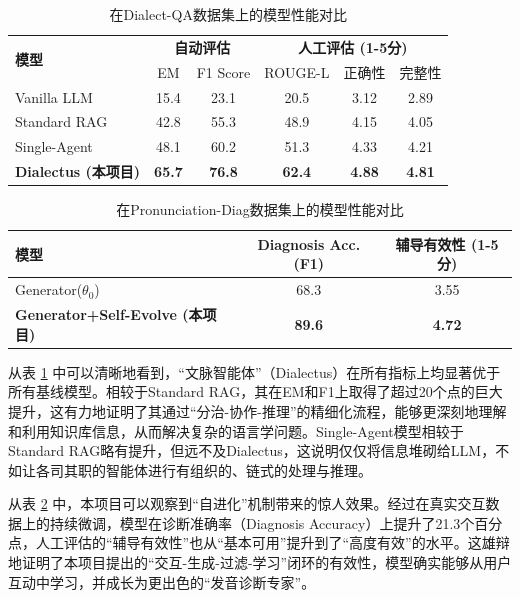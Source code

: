 \begin{table}[H]
    \centering
    \caption{在Dialect-QA数据集上的模型性能对比}
    \label{tab:main_results_qa}
    \begin{tabular}{@{}l|cc|c|cc@{}}
        \toprule
        \multirow{2}{*}{\textbf{模型}} & \multicolumn{2}{c|}{\textbf{自动评估}} & \multicolumn{3}{c}{\textbf{人工评估 (1-5分)}} \\
        & EM & F1 Score & ROUGE-L & 正确性 & 完整性 \\
        \midrule
        Vanilla LLM & 15.4 & 23.1 & 20.5 & 3.12 & 2.89 \\
        Standard RAG & 42.8 & 55.3 & 48.9 & 4.15 & 4.05 \\
        Single-Agent & 48.1 & 60.2 & 51.3 & 4.33 & 4.21 \\
        \textbf{Dialectus (本项目)} & \textbf{65.7} & \textbf{76.8} & \textbf{62.4} & \textbf{4.88} & \textbf{4.81} \\
        \bottomrule
    \end{tabular}
\end{table}

\begin{table}[H]
    \centering
    \caption{在Pronunciation-Diag数据集上的模型性能对比}
    \label{tab:main_results_diag}
    \begin{tabular}{@{}l|c|c@{}}
        \toprule
        \textbf{模型} & \textbf{Diagnosis Acc. (F1)} & \textbf{辅导有效性 (1-5分)} \\
        \midrule
        Generator($\theta_0$) & 68.3 & 3.55 \\
        \textbf{Generator+Self-Evolve (本项目)} & \textbf{89.6} & \textbf{4.72} \\
        \bottomrule
    \end{tabular}
\end{table}

从表 \ref{tab:main_results_qa} 中可以清晰地看到，“文脉智能体”（Dialectus）在所有指标上均显著优于所有基线模型。相较于Standard RAG，其在EM和F1上取得了超过20个点的巨大提升，这有力地证明了其通过“分治-协作-推理”的精细化流程，能够更深刻地理解和利用知识库信息，从而解决复杂的语言学问题。Single-Agent模型相较于Standard RAG略有提升，但远不及Dialectus，这说明仅仅将信息堆砌给LLM，不如让各司其职的智能体进行有组织的、链式的处理与推理。

从表 \ref{tab:main_results_diag} 中，本项目可以观察到“自进化”机制带来的惊人效果。经过在真实交互数据上的持续微调，模型在诊断准确率（Diagnosis Accuracy）上提升了21.3个百分点，人工评估的“辅导有效性”也从“基本可用”提升到了“高度有效”的水平。这雄辩地证明了本项目提出的“交互-生成-过滤-学习”闭环的有效性，模型确实能够从用户互动中学习，并成长为更出色的“发音诊断专家”。

